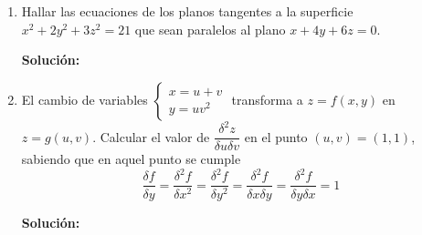 \documentclass[12pt]{article}
\newenvironment{solucion}
{\begin{mdframed}[backgroundcolor=black!10]
		{\bf Solución:}\\
	}
	{
	\end{mdframed}
}
\newenvironment{preguntas}
{\begin{enumerate}\itemsep12pt
	}
	{
	\end{enumerate}
}
\begin{document}
\begin{preguntas}
\begin{solucion}
\end{solucion}
\item Hallar las ecuaciones de los planos tangentes a la superficie $x^2 + 2y^2 + 3z^2 = 21$ que sean paralelos al plano $x + 4y + 6z = 0$.
\begin{solucion}

\end{solucion}
\item El cambio de variables 
	$\begin{cases}
	x=u+v\\
	y=uv^2
	\end{cases}$
	transforma a $z=f(x,y)$ en $z=g(u,v)$. Calcular el valor de $\dfrac{\delta^2z}{\delta u \delta v}$ en el punto $(u,v) = (1,1)$, sabiendo que en aquel punto se cumple$$\dfrac{\delta f}			{\delta y} = \dfrac{\delta^2 f}{\delta x^2}=\dfrac{\delta^2 f}{\delta y^2}=\dfrac{\delta^2 f}{\delta x \delta y}=\dfrac{\delta^2 f}{\delta y \delta x}=1$$
\begin{solucion}

\end{solucion}
\end{preguntas}
\end{document}
